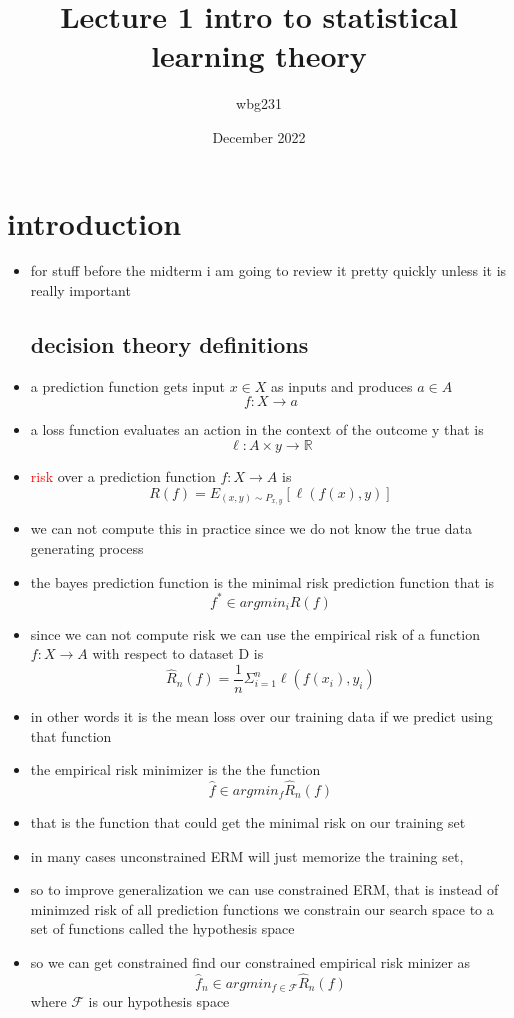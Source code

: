 \documentclass{article}
\title{Lecture 1 intro to statistical learning theory}
\author{wbg231 }
\date{December 2022}
\begin{document}
\maketitle

\section{introduction}
\begin{itemize}
\item for stuff before the midterm i am going to review it pretty quickly unless it is really important 
\subsection*{decision theory definitions}
\item a prediction function gets input $x\in X$ as inputs and produces $a\in A$ $$f:X\rightarrow a$$
\item a loss function evaluates an action in the context of the outcome y that is $$\ell:A\times y\rightarrow \mathbb{R}$$
\item \textcolor{red}{risk} over a prediction function $f:X\rightarrow A$ is $$R(f)=E_{(x,y)\sim P_{x,y}}[\ell(f(x),y)]$$
\item we can not compute this in practice since we do not know the true data generating process
\item the bayes prediction function is the minimal risk prediction function that is $$f^{*}\in argmin_{i}R(f)$$
\item since we can not compute risk we can use the empirical risk of a function  $f:X\rightarrow A$ with respect to dataset D is $$\hat{R}_{n}(f)=\frac{1}{n}\Sigma_{i=1}^{n}\ell(f(x_i), y_i)$$
\item in other words it is the mean loss over our training data if we predict using that function 
\item the empirical risk minimizer is the the function $$\hat{f}\in argmin_{f}\hat{R}_{n}(f)$$
\item that is the function that could get the minimal risk on our training set 
\item in many cases unconstrained ERM will just memorize the training set, 
\item so to improve generalization we can use constrained ERM, that is instead of minimzed risk of all prediction functions we constrain our search space to a set of functions called the hypothesis space
\item so we can get constrained find our constrained empirical risk minizer as  $$\hat{f}_{n}\in argmin_{f\in \mathcal{F}}\hat{R}_{n}(f)$$ where $\mathcal{F}$ is our hypothesis space

\end{itemize}
\end{document}
